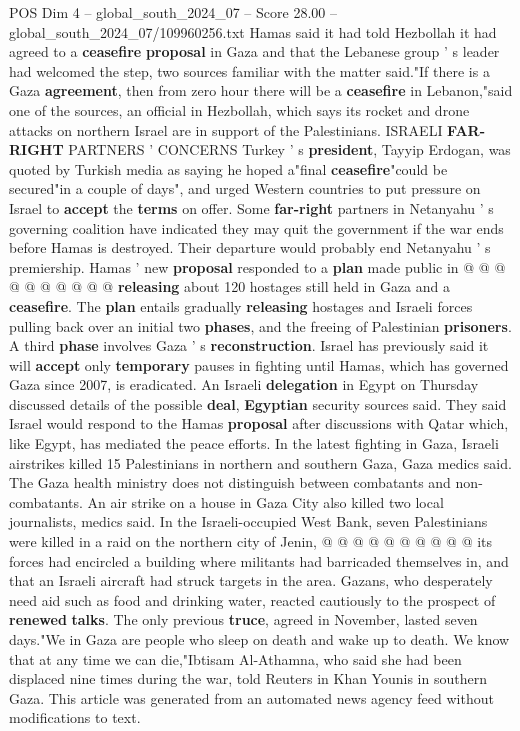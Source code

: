 \begin{textsample}{POS Dim 4 – global\_south\_2024\_07 – Score 28.00 – global\_south\_2024\_07/109960256.txt}
Hamas said it had told Hezbollah it had agreed to a \textbf{ceasefire} \textbf{proposal} in Gaza and that the Lebanese group ' s leader had welcomed the step, two sources familiar with the matter said."If there is a Gaza \textbf{agreement}, then from zero hour there will be a \textbf{ceasefire} in Lebanon,"said one of the sources, an official in Hezbollah, which says its rocket and drone attacks on northern Israel are in support of the Palestinians.
ISRAELI \textbf{FAR-RIGHT} PARTNERS ' CONCERNS Turkey ' s \textbf{president}, Tayyip Erdogan, was quoted by Turkish media as saying he hoped a"final \textbf{ceasefire}"could be secured"in a couple of days", and urged Western countries to put pressure on Israel to \textbf{accept} the \textbf{terms} on offer.
Some \textbf{far-right} partners in Netanyahu ' s governing coalition have indicated they may quit the government if the war ends before Hamas is destroyed.
Their departure would probably end Netanyahu ' s premiership.
Hamas ' new \textbf{proposal} responded to a \textbf{plan} made public in @ @ @ @ @ @ @ @ @ @ \textbf{releasing} about 120 hostages still held in Gaza and a \textbf{ceasefire}.
The \textbf{plan} entails gradually \textbf{releasing} hostages and Israeli forces pulling back over an initial two \textbf{phases}, and the freeing of Palestinian \textbf{prisoners}.
A third \textbf{phase} involves Gaza ' s \textbf{reconstruction}.
Israel has previously said it will \textbf{accept} only \textbf{temporary} pauses in fighting until Hamas, which has governed Gaza since 2007, is eradicated.
An Israeli \textbf{delegation} in Egypt on Thursday discussed details of the possible \textbf{deal}, \textbf{Egyptian} security sources said.
They said Israel would respond to the Hamas \textbf{proposal} after discussions with Qatar which, like Egypt, has mediated the peace efforts.
In the latest fighting in Gaza, Israeli airstrikes killed 15 Palestinians in northern and southern Gaza, Gaza medics said.
The Gaza health ministry does not distinguish between combatants and non-combatants.
An air strike on a house in Gaza City also killed two local journalists, medics said.
In the Israeli-occupied West Bank, seven Palestinians were killed in a raid on the northern city of Jenin, @ @ @ @ @ @ @ @ @ @ its forces had encircled a building where militants had barricaded themselves in, and that an Israeli aircraft had struck targets in the area.
Gazans, who desperately need aid such as food and drinking water, reacted cautiously to the prospect of \textbf{renewed} \textbf{talks}.
The only previous \textbf{truce}, agreed in November, lasted seven days."We in Gaza are people who sleep on death and wake up to death.
We know that at any time we can die,"Ibtisam Al-Athamna, who said she had been displaced nine times during the war, told Reuters in Khan Younis in southern Gaza.
This article was generated from an automated news agency feed without modifications to text.

\end{textsample}
